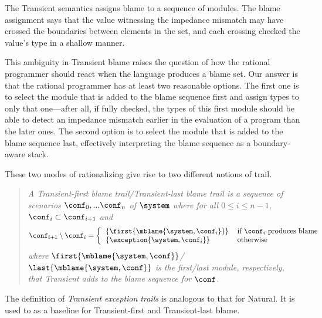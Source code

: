 
The Transient semantics assigns blame to a sequence of modules. The blame
assignment says that the value witnessing the impedance mismatch may have
crossed the boundaries between elements in the set, and each crossing
checked the value's type in a shallow manner.

This ambiguity in Transient blame raises the question of how the rational
programmer should react when the language produces a blame set. Our answer
is that the rational programmer has at least two reasonable options. The first
one is to select the module that is added to the blame sequence first and
assign types to only that one---after all, if fully checked, the types of this
first module should be able to detect an impedance mismatch earlier in the
evaluation of a program than the later ones. The second option is to select the
module that is added to the blame sequence last, effectively interpreting the
blame sequence as a boundary-aware stack.

These two modes of rationalizing give rise to two different notions of trail.

\begin{quote}
\it A \emph{Transient-first blame trail}/\emph{Transient-last blame trail} is a sequence of scenarios
$\conf_0,...\conf_n$ of $\system$ where for all $0 \leq i \leq n - 1$,
$\conf_i \subset \conf_{i+1}$ and
\[ \conf_{i+1} \setminus \conf_i = %
\left\{ %
\begin{tabular}{ll} %
$\{\first{\mblame{\system, \conf_i}}\}$  & if $\conf_i$ produces blame \\ %
$\{\exception{\system, \conf_i}\}$     & otherwise \\ %
\end{tabular} \right. %
\]
where $\first{\mblame{\system, \conf}}$/$\last{\mblame{\system, \conf}}$ is the
first/last module, respectively,  that Transient adds to the blame sequence for $\conf$.
\end{quote}

The definition of \emph{Transient exception trails} is analogous to that for
Natural. It is used to as a baseline for Transient-first and Transient-last
blame.
